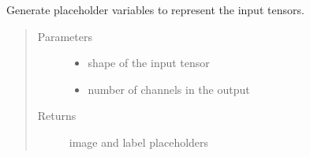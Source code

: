 \documentclass[letterpaper,10pt,english]{sphinxmanual}
\begin{document}
\begin{fulllineitems}
\label{\detokenize{index:unet.ops.placeholder_inputs}}
Generate placeholder variables to represent the input tensors.
\begin{quote}\begin{description}
\item[{Parameters}] \leavevmode\begin{itemize}
\item {} 
 \textendash{} shape of the input tensor

\item {} 
 \textendash{} number of channels in the output

\end{itemize}

\item[{Returns}] \leavevmode
image and label placeholders

\end{description}\end{quote}

\end{fulllineitems}

\end{document}
